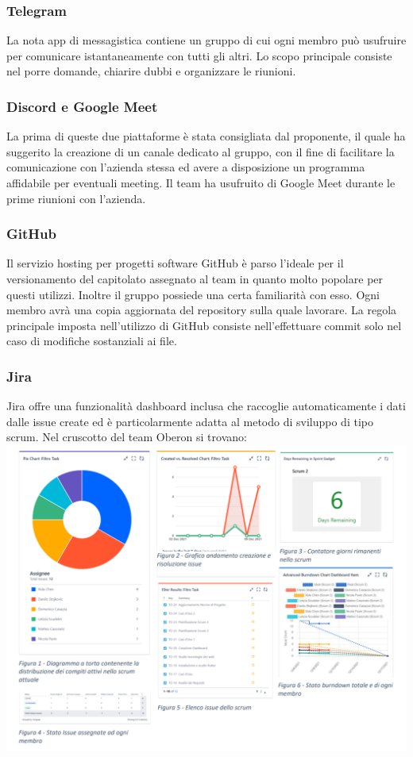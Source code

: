 \subsubsection{Telegram}
La nota app di messagistica contiene un gruppo di cui ogni membro può usufruire per comunicare istantaneamente con tutti gli altri. Lo scopo principale consiste nel porre domande, chiarire dubbi e organizzare le riunioni. 
\subsubsection{Discord e Google Meet}
La prima di queste due piattaforme è stata consigliata dal proponente, il quale ha suggerito la creazione di un canale dedicato al gruppo, con il fine di facilitare la comunicazione con l’azienda stessa ed avere a disposizione un programma affidabile per eventuali meeting.  
\newline Il team ha usufruito di Google Meet durante le prime riunioni con l’azienda. 
\subsubsection{GitHub}
Il servizio hosting per progetti software GitHub è parso l’ideale per il versionamento del capitolato assegnato al team in quanto molto popolare per questi utilizzi. Inoltre il gruppo possiede una certa familiarità con esso. 
Ogni membro avrà una copia aggiornata del repository sulla quale lavorare. La regola principale imposta nell’utilizzo di GitHub consiste nell'effettuare commit solo nel caso di modifiche sostanziali ai file. 
\subsubsection{Jira}
Jira offre una funzionalità dashboard inclusa che raccoglie automaticamente i dati dalle issue create ed è particolarmente adatta al metodo di sviluppo di tipo scrum. Nel cruscotto del team Oberon si trovano: \newline
\noindent
\includegraphics[scale=0.55]{img/imgDashboard.PNG}

